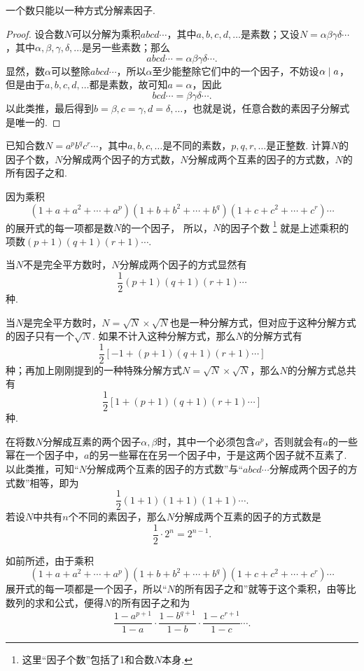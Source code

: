 \begin{theorem}
一个数只能以一种方式分解素因子.
\begin{proof}
设合数\(N\)可以分解为乘积\(abcd\dotsm\)，其中\(a,b,c,d,\dotsc\)是素数；又设\(N = \alpha\beta\gamma\delta\dotsm\)，其中\(\alpha,\beta,\gamma,\delta,\dotsc\)是另一些素数；那么\[
abcd\dotsm = \alpha\beta\gamma\delta\dotsm.
\]
显然，数\(\alpha\)可以整除\(abcd\dotsm\)，所以\(\alpha\)至少能整除它们中的一个因子，不妨设\(\alpha\mid a\)，但是由于\(a,b,c,d,\dotsc\)都是素数，故可知\(a=\alpha\)，因此\[
bcd\dotsm = \beta\gamma\delta\dotsm.
\]以此类推，最后得到\(b=\beta,c=\gamma,d=\delta,\dotsc\)，也就是说，任意合数的素因子分解式是唯一的.
\end{proof}
\end{theorem}

\begin{example}
已知合数\(N = a^p b^q c^r \dotsm\)，其中\(a,b,c,\dotsc\)是不同的素数，\(p,q,r,\dotsc\)是正整数.
计算\(N\)的因子个数，\(N\)分解成两个因子的方式数，\(N\)分解成两个互素的因子的方式数，\(N\)的所有因子之和.
\begin{solution}
因为乘积\[
(1+a+a^2+\dotsb+a^p)
(1+b+b^2+\dotsb+b^q)
(1+c+c^2+\dotsb+c^r)\dotsm
\]的展开式的每一项都是数\(N\)的一个因子，%
所以，\(N\)的因子个数%
\footnote{这里“因子个数”包括了1和合数\(N\)本身.}%
就是上述乘积的项数\((p+1)(q+1)(r+1)\dotsm\).

当\(N\)不是完全平方数时，\(N\)分解成两个因子的方式显然有\[
\frac{1}{2} (p+1)(q+1)(r+1)\dotsm
\]种.

当\(N\)是完全平方数时，\(N = \sqrt{N}\times\sqrt{N}\)也是一种分解方式，但对应于这种分解方式的因子只有一个\(\sqrt{N}\).
如果不计入这种分解方式，那么\(N\)的分解方式有\[
\frac{1}{2} \left[-1 + (p+1)(q+1)(r+1)\dotsm\right]
\]种；再加上刚刚提到的一种特殊分解方式\(N = \sqrt{N}\times\sqrt{N}\)，那么\(N\)的分解方式总共有\[
\frac{1}{2} \left[1 + (p+1)(q+1)(r+1)\dotsm\right]
\]种.

在将数\(N\)分解成互素的两个因子\(\alpha,\beta\)时，其中一个必须包含\(a^p\)，否则就会有\(a\)的一些幂在一个因子中，\(a\)的另一些幂在在另一个因子中，于是这两个因子就不互素了.
以此类推，可知“\(N\)分解成两个互素的因子的方式数”与“\(abcd\dotsm\)分解成两个因子的方式数”相等，即为\[
\frac{1}{2}(1+1)(1+1)(1+1)\dotsm.
\]若设\(N\)中共有\(n\)个不同的素因子，那么\(N\)分解成两个互素的因子的方式数是\[
\frac{1}{2} \cdot 2^n = 2^{n-1}.
\]

如前所述，由于乘积\[
(1+a+a^2+\dotsb+a^p)
(1+b+b^2+\dotsb+b^q)
(1+c+c^2+\dotsb+c^r)\dotsm
\]展开式的每一项都是一个因子，所以“\(N\)的所有因子之和”就等于这个乘积，由等比数列的求和公式，便得\(N\)的所有因子之和为\[
\frac{1-a^{p+1}}{1-a}\cdot\frac{1-b^{q+1}}{1-b}\cdot\frac{1-c^{r+1}}{1-c}\dotsm.
\]
\end{solution}
\end{example}

